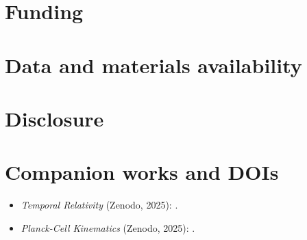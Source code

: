 \documentclass[11pt,oneside]{article}
\begin{document}
\section*{Funding}

\section*{Data and materials availability}

\section*{Disclosure}

\section*{Companion works and DOIs}

\begin{itemize}\setlength\itemsep{0.25em}
  \item \textit{Temporal Relativity} (Zenodo, 2025): .
  \item \textit{Planck-Cell Kinematics} (Zenodo, 2025): .
\end{itemize}

\clearpage
\nocite{*} %

\end{document}
